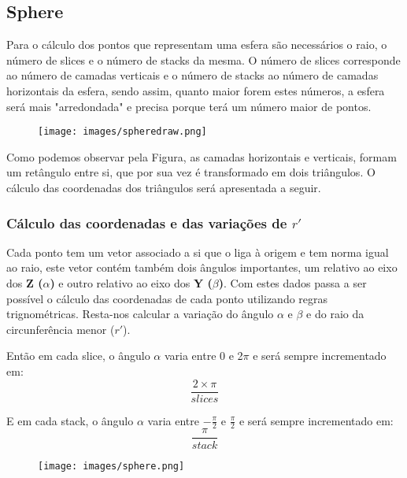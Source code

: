 \Huge\documentclass{article}
\begin{document}
\subsection{Sphere}

Para o cálculo dos pontos que representam uma esfera são necessários o raio, o número de slices e o número de stacks da mesma. O número de slices corresponde ao número de camadas verticais e o número de stacks ao número de camadas horizontais da esfera, sendo assim, quanto maior forem estes números, a esfera será mais "arredondada" e precisa porque terá um número maior de pontos.

\begin{figure}[h]
\centering
\texttt{[image: images/spheredraw.png]}
\end{figure}

\vspace{0.5cm}

Como podemos observar pela Figura, as camadas horizontais e verticais, formam um retângulo entre si, que por sua vez é transformado em dois triângulos. O cálculo das coordenadas dos triângulos será apresentada a seguir.

\subsubsection{Cálculo das coordenadas e das variações de $r'$}

Cada ponto tem um vetor associado a si que o liga à origem e tem norma igual ao raio, este vetor contém também dois ângulos importantes, um relativo ao eixo dos \textbf{Z ($\alpha$)} e outro relativo ao eixo dos \textbf{Y ($\beta$)}. Com estes dados passa a ser possível o cálculo das coordenadas de cada ponto utilizando regras trignométricas. Resta-nos calcular a variação do ângulo $\alpha$ e $\beta$ e do raio da circunferência menor ($r'$).

\vspace{0.5cm}

Então em cada slice, o ângulo $\alpha$ varia entre 0 e 2$\pi$ e será sempre incrementado em:
\[\frac{2\times\pi}{slices}\]

E em cada stack, o ângulo $\alpha$ varia entre $-\frac{\pi}{2}$ e $\frac{\pi}{2}$ e será sempre incrementado em:
\[\frac{\pi}{stack}\]

\vspace{0.5cm}

\begin{figure}[h]
\centering
\texttt{[image: images/sphere.png]}
\end{figure}
\end{document}
